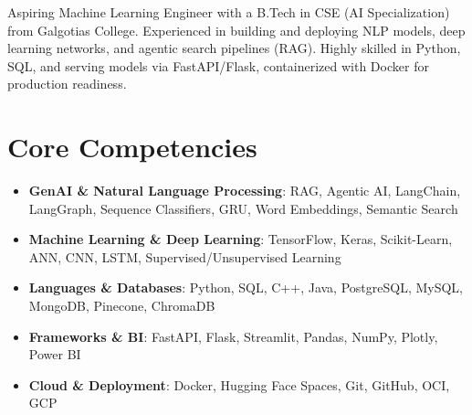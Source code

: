 \documentclass[11pt,a4paper,sans]{moderncv}
\begin{document}
\makecvtitle

\vspace{6pt}
\small{Aspiring Machine Learning Engineer with a B.Tech in CSE (AI Specialization) from Galgotias College. Experienced in building and deploying NLP models, deep learning networks, and agentic search pipelines (RAG). Highly skilled in Python, SQL, and serving models via FastAPI/Flask, containerized with Docker for production readiness.}

\section{Core Competencies}
\vspace{1pt}
\begin{itemize}
\item \textbf{GenAI \& Natural Language Processing}: RAG, Agentic AI, LangChain, LangGraph, Sequence Classifiers, GRU, Word Embeddings, Semantic Search
\item \textbf{Machine Learning \& Deep Learning}: TensorFlow, Keras, Scikit-Learn, ANN, CNN, LSTM, Supervised/Unsupervised Learning
\item \textbf{Languages \& Databases}: Python, SQL, C++, Java, PostgreSQL, MySQL, MongoDB, Pinecone, ChromaDB
\item \textbf{Frameworks \& BI}: FastAPI, Flask, Streamlit, Pandas, NumPy, Plotly, Power BI
\item \textbf{Cloud \& Deployment}: Docker, Hugging Face Spaces, Git, GitHub, OCI, GCP
\end{itemize}
\end{document}
